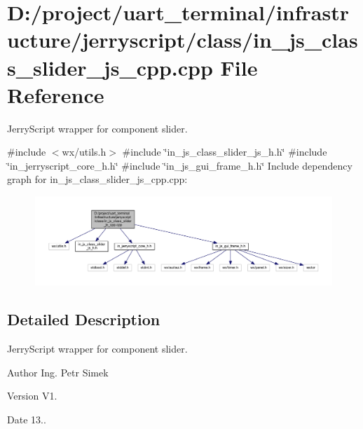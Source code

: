 \section{D\+:/project/uart\+\_\+terminal/infrastructure/jerryscript/class/in\+\_\+js\+\_\+class\+\_\+slider\+\_\+js\+\_\+cpp.cpp File Reference}
\label{in__js__class__slider__js__cpp_8cpp}


Jerry\+Script wrapper for component slider.  


{\ttfamily \#include $<$wx/utils.\+h$>$}\newline
{\ttfamily \#include \char`\"{}in\+\_\+js\+\_\+class\+\_\+slider\+\_\+js\+\_\+h.\+h\char`\"{}}\newline
{\ttfamily \#include \char`\"{}in\+\_\+jerryscript\+\_\+core\+\_\+h.\+h\char`\"{}}\newline
{\ttfamily \#include \char`\"{}in\+\_\+js\+\_\+gui\+\_\+frame\+\_\+h.\+h\char`\"{}}\newline
Include dependency graph for in\+\_\+js\+\_\+class\+\_\+slider\+\_\+js\+\_\+cpp.\+cpp\+:
\nopagebreak
\begin{figure}[H]
\begin{center}
\leavevmode
\includegraphics[width=350pt]{in__js__class__slider__js__cpp_8cpp__incl}
\end{center}
\end{figure}


\subsection{Detailed Description}
Jerry\+Script wrapper for component slider. 

\begin{DoxyAuthor}{Author}
Ing. Petr Simek 
\end{DoxyAuthor}
\begin{DoxyVersion}{Version}
V1. 
\end{DoxyVersion}
\begin{DoxyDate}{Date}
13.. 
\end{DoxyDate}
